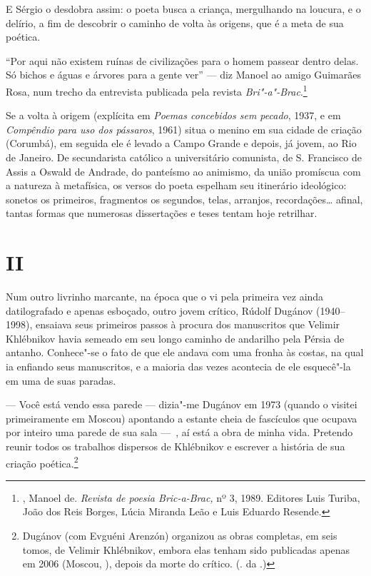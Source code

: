 E Sérgio o desdobra assim: o poeta busca a criança, mergulhando na
loucura, e o delírio, a fim de descobrir o caminho de volta às origens,
que é a meta de sua poética.

``Por aqui não existem ruínas de civilizações para o homem passear
dentro delas. Só bichos e águas e árvores para a gente ver'' --- diz
Manoel ao amigo Guimarães Rosa, num trecho da entrevista publicada pela
revista \emph{Bri"-a"-Brac}.\footnote{, Manoel de. \emph{Revista de
  poesia Bric-a-Brac,} nº 3, 1989. Editores Luis Turiba, João dos Reis
  Borges, Lúcia Miranda Leão e Luis Eduardo Resende.}

Se a volta à origem (explícita em \emph{Poemas concebidos sem pecado}, 1937, e em \emph{Compêndio para uso dos pássaros}, 1961) situa o menino
em sua cidade de criação (Corumbá), em seguida ele é levado a Campo
Grande e depois, já jovem, ao Rio de Janeiro. De secundarista católico a
universitário comunista, de S. Francisco de Assis a Oswald de Andrade,
do panteísmo ao animismo, da união promíscua com a natureza à
metafísica, os versos do poeta espelham seu itinerário ideológico:
sonetos os primeiros, fragmentos os segundos, telas, arranjos,
recordações\ldots{} afinal, tantas formas que numerosas dissertações e teses
tentam hoje retrilhar.

\section{\uppercase{II}}

Num outro livrinho marcante, na época que o vi pela primeira vez ainda datilografado e apenas
esboçado, outro jovem crítico, Rúdolf Dugánov (1940--1998), ensaiava seus primeiros
passos à procura dos manuscritos que Velimir Khlébnikov
havia semeado em seu longo caminho de andarilho pela Pérsia de
antanho. Conhece"-se o fato de que ele andava com uma fronha às costas, na
qual ia enfiando seus manuscritos, e a maioria das vezes acontecia de
ele esquecê"-la em uma de suas paradas.

--- Você está vendo essa parede --- dizia"-me Dugánov em 1973 (quando o visitei
primeiramente em Moscou) apontando a estante cheia de fascículos que
ocupava por inteiro uma parede de sua sala ---~, aí está a obra
de minha vida. Pretendo reunir todos os trabalhos dispersos de Khlébnikov
e escrever a história de sua criação poética.\footnote{Dugánov (com
  Evguéni Arenzón) organizou as obras completas, em seis tomos, de
  Velimir Khlébnikov, embora elas tenham sido publicadas apenas em 2006
  (Moscou, ), depois da morte do crítico. (. da .)}

